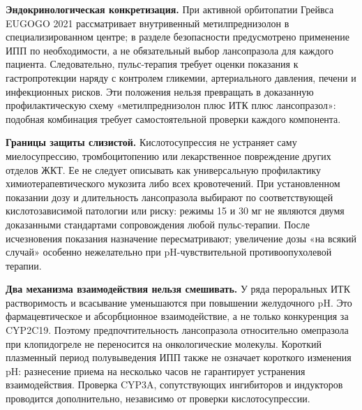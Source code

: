 \documentclass[11pt,a4paper,notitlepage]{report}
\newcommand{\src}[1]{\unskip\space\cite{#1}}
\begin{document}
\textbf{Эндокринологическая конкретизация.} При активной орбитопатии Грейвса EUGOGO 2021 рассматривает внутривенный метилпреднизолон в специализированном центре; в разделе безопасности предусмотрено применение ИПП по необходимости, а не обязательный выбор лансопразола для каждого пациента. Следовательно, пульс-терапия требует оценки показания к гастропротекции наряду с контролем гликемии, артериального давления, печени и инфекционных рисков. Эти положения нельзя превращать в доказанную профилактическую схему «метилпреднизолон плюс ИТК плюс лансопразол»: подобная комбинация требует самостоятельной проверки каждого компонента.\src{oncoeugogo2021}

\textbf{Границы защиты слизистой.} Кислотосупрессия не устраняет саму миелосупрессию, тромбоцитопению или лекарственное повреждение других отделов ЖКТ. Ее не следует описывать как универсальную профилактику химиотерапевтического мукозита либо всех кровотечений. При установленном показании дозу и длительность лансопразола выбирают по соответствующей кислотозависимой патологии или риску: режимы 15 и 30 мг не являются двумя доказанными стандартами сопровождения любой пульс-терапии. После исчезновения показания назначение пересматривают; увеличение дозы «на всякий случай» особенно нежелательно при pH-чувствительной противоопухолевой терапии.\src{uslabel,oncoppiposition2016,oncocaltablet2026,agadepres}

\textbf{Два механизма взаимодействия нельзя смешивать.} У ряда пероральных ИТК растворимость и всасывание уменьшаются при повышении желудочного pH. Это фармацевтическое и абсорбционное взаимодействие, а не только конкуренция за CYP2C19. Поэтому предпочтительность лансопразола относительно омепразола при клопидогреле не переносится на онкологические молекулы. Короткий плазменный период полувыведения ИПП также не означает короткого изменения pH: разнесение приема на несколько часов не гарантирует устранения взаимодействия. Проверка CYP3A, сопутствующих ингибиторов и индукторов проводится дополнительно, независимо от проверки кислотосупрессии.\src{oncobosulif2026,oncodasatinib2026,oncocalcaps2026}
\end{document}
